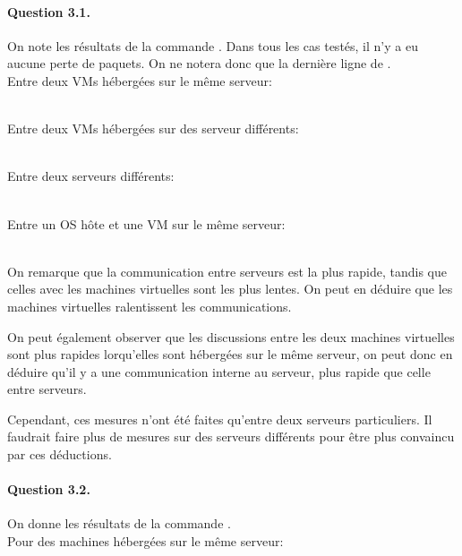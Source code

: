\documentclass[12pt]{article}
\begin{document}
\paragraph{Question 3.1.}
On note les résultats de la commande . Dans tous les cas testés, il n'y a eu aucune perte de paquets. On ne notera donc que la dernière ligne de .
\\

Entre deux VMs hébergées sur le même serveur:

\\

Entre deux VMs hébergées sur des serveur différents:

\\

Entre deux serveurs différents:

\\

Entre un OS hôte et une VM sur le même serveur:

\\

On remarque que la communication entre serveurs est la plus rapide, tandis que celles avec les machines virtuelles sont les plus lentes. On peut en déduire que les machines virtuelles ralentissent les communications.

On peut également observer que les discussions entre les deux machines virtuelles sont plus rapides lorqu'elles sont hébergées sur le même serveur, on peut donc en déduire qu'il y a une communication interne au serveur, plus rapide que celle entre serveurs.

Cependant, ces mesures n'ont été faites qu'entre deux serveurs particuliers. Il faudrait faire plus de mesures sur des serveurs différents pour être plus convaincu par ces déductions. 

\paragraph{Question 3.2.}
On donne les résultats de la commande .
\\

Pour des machines hébergées sur le même serveur:

\\
\end{document}

